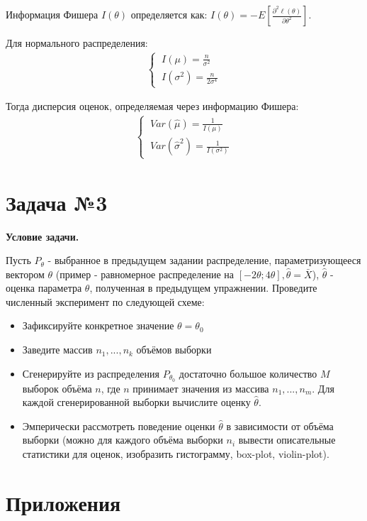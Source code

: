 \documentclass[12pt]{article}
\begin{document}
Информация Фишера $ I(\theta) $ определяется как:  $I(\theta) = -E\left[\frac{\partial^2 \ell(\theta)}{\partial \theta^2}\right]$.

Для нормального распределения:
\begin{gather*}
	\begin{cases}
		\ I(\mu) = \frac{n}{\sigma^2} \\
		\ I(\sigma^2) = \frac{n}{2\sigma^4}
	\end{cases}
\end{gather*}

Тогда дисперсия оценок, определяемая через информацию Фишера:
\begin{gather*}
	\begin{cases}
		\ Var(\hat{\mu}) = \frac{1}{I(\mu)} \\
		\ Var(\hat{\sigma}^2) = \frac{1}{I(\sigma^2)}
	\end{cases}
\end{gather*}
\newpage

\section*{Задача №3}

\textbf{Условие задачи.}

Пусть $P_{\theta}$ - выбранное в предыдущем задании распределение, параметризующееся вектором $\theta$ (пример - равномерное распределение на $[-2\theta; 4\theta], \hat{\theta} = \bar{X}$), $\hat{\theta}$ - оценка параметра $\theta$, полученная в предыдущем упражнении. Проведите численный эксперимент по следующей схеме:
\begin{itemize}
    \item Зафиксируйте конкретное значение $\theta=\theta_0$
    \item Заведите массив ${n_1, ..., n_k}$ объёмов выборки
    \item Сгенерируйте из распределения $P_{\theta_0}$ достаточно большое количество $M$ выборок объёма $n$, где $n$ принимает значения из массива ${n_1, ..., n_m}$. Для каждой сгенерированной выборки вычислите оценку $\hat{\theta}$.
    \item Эмперически рассмотреть поведение оценки $\hat{\theta}$ в зависимости от объёма выборки (можно для каждого объёма выборки $n_i$ вывести описательные статистики для оценок, изобразить гистограмму, box-plot, violin-plot).
\end{itemize}
\newpage
{}
\section*{Приложения}
\end{document}
